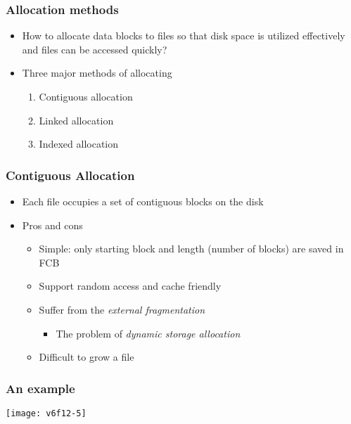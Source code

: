 \documentclass[CJKutf8,xcolor=pdftex,dvipsnames,table]{beamer}
\begin{document}
\begin{CJK*}{UTF8}{song}
  \begin{frame}
    \frametitle{Allocation methods} \pause
    \begin{itemize}\parskip=0pt
    \item How to allocate data blocks to files so that disk space is utilized effectively and files can be accessed quickly? \pause
    \item Three major methods of allocating \pause
      \begin{enumerate}\parskip=0pt
      \item Contiguous allocation \pause
      \item Linked allocation \pause
      \item Indexed allocation
      \end{enumerate}
    \end{itemize}
  \end{frame}
  
  \begin{frame}
    \frametitle{Contiguous Allocation} \pause
    \begin{itemize}\parskip=0pt
    \item Each file occupies a set of contiguous blocks on the disk \pause
    \item Pros and cons \pause
      \begin{itemize}\parskip=0pt
      \item Simple: only starting block and length (number of blocks) are saved in FCB \pause
      \item Support random access and cache friendly \pause
      \item Suffer from the \emph{external fragmentation} \pause

        \begin{itemize}\parskip=0pt
        \item The problem of \emph{dynamic storage allocation} \pause
        \end{itemize}

      \item Difficult to grow a file
      \end{itemize}
    \end{itemize}
  \end{frame}
  
  \begin{frame}
    \frametitle{An example} \pause
    \begin{center}
      \texttt{[image: v6f12-5]}
    \end{center}
  \end{frame}
  

\end{CJK*}
\end{document}
